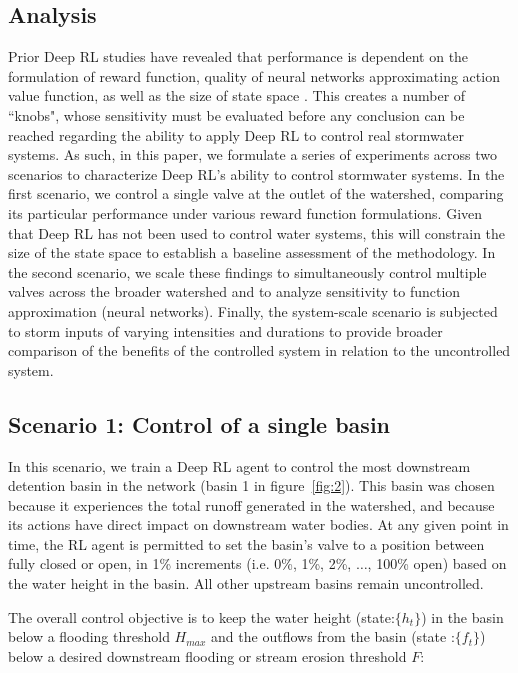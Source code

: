 \subsection{Analysis}
Prior Deep RL studies have revealed that performance is dependent on the formulation of reward function, quality of neural networks approximating action value function, as well as the size of state space \cite{Sutton98, henderson2017Deep}.
This creates a number of ``knobs", whose sensitivity must be evaluated before any conclusion can be reached regarding the ability to apply Deep RL to control real stormwater systems.
As such, in this paper, we formulate a series of experiments across two scenarios to characterize Deep RL’s ability to control stormwater systems.
In the first scenario, we control a single valve at the outlet of the watershed, comparing its particular performance under various reward function formulations.
Given that Deep RL has not been used to control water systems, this will constrain the size of the state space to establish a baseline assessment of the methodology.
In the second scenario, we scale these findings to simultaneously control multiple valves across the broader watershed and to analyze  sensitivity to function approximation (neural networks). Finally, the system-scale scenario is subjected to storm inputs of varying intensities and durations to provide broader comparison of the benefits of the controlled system in relation to the uncontrolled system.

\subsection{Scenario 1: Control of a single basin}
In this scenario, we train a Deep RL agent to control the most downstream detention basin in the network (basin 1 in figure~\ref{fig:2}).
This basin was chosen because it experiences the total runoff generated in the watershed, and because its actions have direct impact on downstream water bodies.
At any given point in time, the RL agent is permitted to set the basin’s valve to a position between fully closed or open, in 1\% increments (i.e. 0\%, 1\%, 2\%, $\ldots$, 100\% open) based on the water height in the basin. All other upstream basins remain uncontrolled.

The overall control objective is to keep the water height (state:$\{h_t\}$) in the basin below a flooding threshold $H_{max}$ and the outflows from the basin (state :$\{f_t\}$) below a desired downstream flooding or stream erosion threshold $F$:

